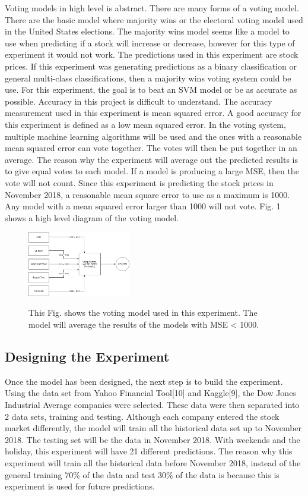 \documentclass[journal]{IEEEtran}
\begin{document}
Voting models in high level is abstract. There are many forms of a voting model. There are the basic model where majority wins or the electoral voting model used in the United States elections. The majority wins model seems like a model to use when predicting if a stock will increase or decrease, however for this type of experiment it would not work. The predictions used in this experiment are stock prices. If this experiment was generating predictions as a binary classification or general multi-class classifications, then a majority wins voting system could be use. For this experiment, the goal is to beat an SVM model or be as accurate as possible. Accuracy in this project is difficult to understand. The accuracy measurement used in this experiment is mean squared error. A good accuracy for this experiment is defined as a low mean squared error. In the voting system, multiple machine learning algorithms will be used and the ones with a reasonable mean squared error can vote together. The votes will then be put together in an average. The reason why the experiment will average out the predicted results is to give equal votes to each model. If a model is producing a large MSE, then the vote will not count. Since this experiment is predicting the stock prices in November 2018, a reasonable mean square error to use as a maximum is 1000. Any model with a mean squared error larger than 1000 will not vote. Fig. 1 shows a high level diagram of the voting model.

\begin{figure}[H]
\centering
\includegraphics[width = 0.4\textwidth]{voting_model.png}
\label{vm}
\caption{This Fig. shows the voting model used in this experiment. The model will average the results of the models with MSE < 1000.}
\end{figure}

\subsection{Designing the Experiment}
Once the model has been designed, the next step is to build the experiment. Using the data set from Yahoo Financial Tool[10] and Kaggle[9], the Dow Jones Industrial Average companies were selected. These data were then separated into 2 data sets, training and testing. Although each company entered the stock market differently, the model will train all the historical data set up to November 2018. The testing set will be the data in November 2018. With weekends and the holiday, this experiment will have 21 different predictions. The reason why this experiment will train all the historical data before November 2018, instead of the general training 70\% of the data and test 30\% of the data is because this is experiment is used for future predictions. 
\end{document}
